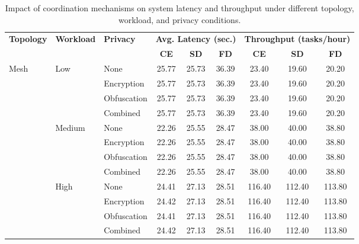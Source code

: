 \begin{table}[!t]
\centering
\caption{Impact of coordination mechanisms on system latency and throughput under different topology, workload, and privacy conditions.}
\label{tab:privacy_performance}
\setlength{\tabcolsep}{6pt}
\begin{tabular}{lllccc ccc}
\toprule
\multirow{2}{*}{\textbf{Topology}} & \multirow{2}{*}{\textbf{Workload}} & \multirow{2}{*}{\textbf{Privacy}}
& \multicolumn{3}{c}{\textbf{Avg. Latency (sec.)}} & \multicolumn{3}{c}{\textbf{Throughput (tasks/hour)}} \\
\cmidrule(lr){4-6}
\cmidrule(lr){7-9}
& & & \textbf{CE} & \textbf{SD} & \textbf{FD} & \textbf{CE} & \textbf{SD} & \textbf{FD} \\
\midrule
\multirow{12}{*}{Mesh} & \multirow{4}{*}{Low} & None & 25.77 & \cellcolor[gray]{0.70}25.73 & 36.39 & \cellcolor[gray]{0.70}23.40 & 19.60 & 20.20 \\
 &  & Encryption & 25.77 & \cellcolor[gray]{0.70}25.73 & 36.39 & \cellcolor[gray]{0.70}23.40 & 19.60 & 20.20 \\
 &  & Obfuscation & 25.77 & \cellcolor[gray]{0.70}25.73 & 36.39 & \cellcolor[gray]{0.70}23.40 & 19.60 & 20.20 \\
 &  & Combined & 25.77 & \cellcolor[gray]{0.70}25.73 & 36.39 & \cellcolor[gray]{0.70}23.40 & 19.60 & 20.20 \\
\cmidrule(lr){2-9}
 & \multirow{4}{*}{Medium} & None & \cellcolor[gray]{0.70}22.26 & 25.55 & 28.47 & 38.00 & \cellcolor[gray]{0.70}40.00 & 38.80 \\
 &  & Encryption & \cellcolor[gray]{0.70}22.26 & 25.55 & 28.47 & 38.00 & \cellcolor[gray]{0.70}40.00 & 38.80 \\
 &  & Obfuscation & \cellcolor[gray]{0.70}22.26 & 25.55 & 28.47 & 38.00 & \cellcolor[gray]{0.70}40.00 & 38.80 \\
 &  & Combined & \cellcolor[gray]{0.70}22.26 & 25.55 & 28.47 & 38.00 & \cellcolor[gray]{0.70}40.00 & 38.80 \\
\cmidrule(lr){2-9}
 & \multirow{4}{*}{High} & None & \cellcolor[gray]{0.70}24.41 & 27.13 & 28.51 & \cellcolor[gray]{0.70}116.40 & 112.40 & 113.80 \\
 &  & Encryption & \cellcolor[gray]{0.70}24.42 & 27.13 & 28.51 & \cellcolor[gray]{0.70}116.40 & 112.40 & 113.80 \\
 &  & Obfuscation & \cellcolor[gray]{0.70}24.41 & 27.13 & 28.51 & \cellcolor[gray]{0.70}116.40 & 112.40 & 113.80 \\
 &  & Combined & \cellcolor[gray]{0.70}24.42 & 27.13 & 28.51 & \cellcolor[gray]{0.70}116.40 & 112.40 & 113.80 \\

\end{tabular}
\end{table}
